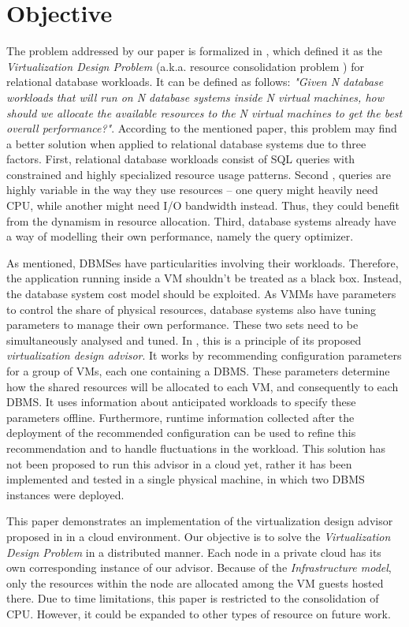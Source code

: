 \section{Objective}

The problem addressed by our paper is formalized in \cite{4401021}, which defined it as the \textit{Virtualization Design Problem} (a.k.a. resource consolidation problem ) for relational database workloads. It can be defined as follows: \textit{"Given N database workloads that will run on N database systems inside N virtual 
machines, how should we allocate the available resources to the N virtual machines to get the best overall performance?"}. According to the mentioned paper, this problem may find a better solution when applied to relational database systems due to three factors. First, relational database workloads consist of SQL queries with constrained and highly specialized resource usage patterns. Second , queries are highly variable in the way they use resources -- one query might heavily need CPU, while another might need I/O bandwidth instead. Thus, they could benefit from the dynamism in resource allocation. Third, database systems already have a way of modelling their own performance, namely the query optimizer.

As mentioned, DBMSes have particularities involving their workloads. Therefore, the application running inside a VM shouldn't be treated as a black box. Instead, the database system cost model should be exploited. As VMMs have parameters to control the share of physical resources, database systems also have tuning parameters to manage their own performance. These two sets need to be simultaneously analysed and tuned. In \cite{Soror:2008:AVM:1376616.1376711}, this is a principle of its proposed \textit{virtualization design advisor}. It works by recommending configuration parameters for a group of VMs, each one containing a DBMS. These parameters determine how the shared resources will be allocated to each VM, and consequently to each DBMS. It uses information about anticipated workloads to specify these parameters offline. Furthermore, runtime information collected after the deployment of the recommended configuration can be used to refine this recommendation and to handle fluctuations in the workload. This 
solution has 
not been proposed to run this advisor in a cloud yet, rather it has been implemented and tested in a single physical machine, in which two DBMS instances were deployed.

This paper demonstrates an implementation of the virtualization design advisor proposed in \cite{Soror:2008:AVM:1376616.1376711} in a cloud environment. Our objective is to solve the \textit{Virtualization Design Problem} in a distributed manner. Each node in a private cloud has its own corresponding instance of our advisor. Because of the \textit{Infrastructure model}, only the resources within the node are allocated among the VM guests hosted there. Due to time limitations, this paper is restricted to the consolidation of CPU. However, it could be expanded to other types of resource on future work. 

